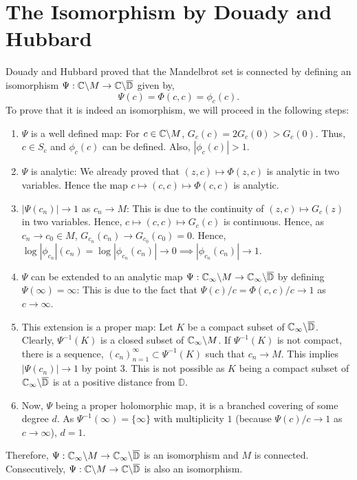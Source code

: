 \section{The Isomorphism by Douady and Hubbard}
Douady and Hubbard proved that the Mandelbrot set is connected by defining an isomorphism \( \Psi:\mathbb{C}\backslash M \to \mathbb{C}\backslash \overline{\mathbb{D}}  \) given by, \[
	\Psi(c)=\Phi(c,c)=\phi_c(c)
.\] 
To prove that it is indeed an isomorphism, we will proceed in the following steps:
\begin{enumerate}
	\item \( \Psi \) is a well defined map: For \( c\in \mathbb{C}\backslash M \), \( G_c(c)=2G_c(0)>G_c(0) \). Thus, \( c\in S_c \) and \( \phi_c(c) \) can be defined. Also, \( |\phi_c(c)|>1 \).
	\item \( \Psi \) is analytic: We already proved that \( (z,c)\mapsto \Phi(z,c) \) is analytic in two
		variables. Hence the map \( c\mapsto (c,c)\mapsto \Phi(c,c) \) is analytic.
	\item \( |\Psi(c_n)|\to 1 \) as \( c_n\to M \): This is due to the continuity of \( (z,c)\mapsto G_c(z) \) in two variables. Hence, \( c\mapsto (c,c)\mapsto G_c(c) \) is continuous. Hence, as \( c_n\to c_0\in M \), \( G_{c_n}(c_n)\to G_{c_0}(c_0)=0 \). Hence, \( \log |\phi_{c_n}|(c_n) = \log |\phi_{c_n}(c_n)|\to 0\implies|\phi_{c_n}(c_n)|\to 1  \).
	\item \( \Psi \) can be extended to an analytic map \( \Psi:\mathbb{C}_\infty\backslash M\to \mathbb{C}_\infty\backslash \overline{\mathbb{D}}  \) by defining \( \Psi(\infty)=\infty \): This is due to the fact that \( \Psi(c) /c=\Phi(c,c) /c\to 1 \) as \( c\to \infty \).
	\item This extension is a proper map: Let \( K \) be a compact subset of \( \mathbb{C}_\infty\backslash \overline{\mathbb{D}}  \). Clearly, \( \Psi^{-1}(K) \) is a closed subset of \( \mathbb{C}_\infty\backslash M \). If \( \Psi^{-1}(K) \) is not compact, there is a sequence, \( (c_n)_{n=1}^\infty\subset \Psi^{-1}(K) \) such that \( c_n\to M \). This implies \( |\Psi(c_n)|\to 1 \) by point 3. This is not possible as \( K \) being a compact subset of \( \mathbb{C}_\infty\backslash\overline{\mathbb{D}} \) is at a positive distance from \( \mathbb{D} \).
	\item Now, \( \Psi \) being a proper holomorphic map, it is a branched covering of some degree \( d \).
		As \( \Psi^{-1}(\infty)=\{\infty\} \) with multiplicity \( 1 \) (because \( \Psi(c) /c\to 1 \)
		as \( c\to \infty \)), \( d=1 \).
\end{enumerate}
Therefore, \( \Psi:\mathbb{C}_\infty\backslash M\to \mathbb{C}_\infty\backslash \overline{\mathbb{D}}  \) is an isomorphism and \( M \)
is connected. Consecutively, \( \Psi:\mathbb{C}\backslash M\to \mathbb{C}\backslash \overline{\mathbb{D}}  \) is 
also an isomorphism.
